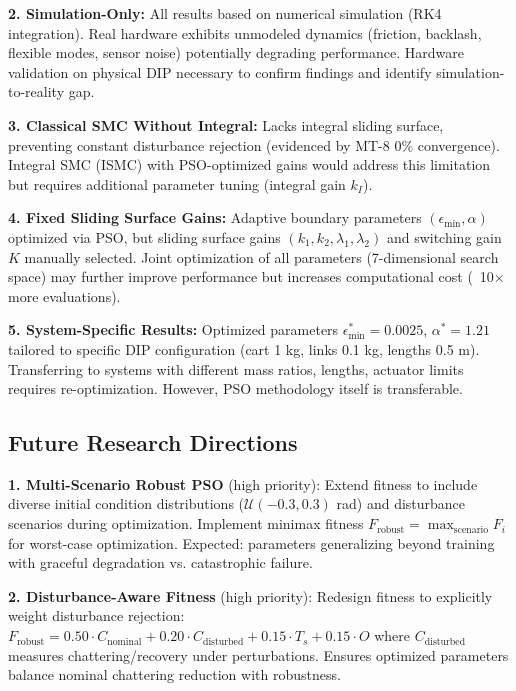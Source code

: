 \documentclass[conference]{IEEEtran}
\begin{document}
\textbf{2. Simulation-Only:} All results based on numerical simulation (RK4 integration). Real hardware exhibits unmodeled dynamics (friction, backlash, flexible modes, sensor noise) potentially degrading performance. Hardware validation on physical DIP necessary to confirm findings and identify simulation-to-reality gap.

\textbf{3. Classical SMC Without Integral:} Lacks integral sliding surface, preventing constant disturbance rejection (evidenced by MT-8 0\% convergence). Integral SMC (ISMC) with PSO-optimized gains would address this limitation but requires additional parameter tuning (integral gain $k_I$).

\textbf{4. Fixed Sliding Surface Gains:} Adaptive boundary parameters $(\epsilon_{\min}, \alpha)$ optimized via PSO, but sliding surface gains $(k_1, k_2, \lambda_1, \lambda_2)$ and switching gain $K$ manually selected. Joint optimization of all parameters (7-dimensional search space) may further improve performance but increases computational cost (~10$\times$ more evaluations).

\textbf{5. System-Specific Results:} Optimized parameters $\epsilon_{\min}^* = 0.0025$, $\alpha^* = 1.21$ tailored to specific DIP configuration (cart 1 kg, links 0.1 kg, lengths 0.5 m). Transferring to systems with different mass ratios, lengths, actuator limits requires re-optimization. However, PSO methodology itself is transferable.

\subsection{Future Research Directions}

\textbf{1. Multi-Scenario Robust PSO} (high priority): Extend fitness to include diverse initial condition distributions ($\mathcal{U}(-0.3, 0.3)$ rad) and disturbance scenarios during optimization. Implement minimax fitness $F_{\text{robust}} = \max_{\text{scenario}} F_i$ for worst-case optimization. Expected: parameters generalizing beyond training with graceful degradation vs. catastrophic failure.

\textbf{2. Disturbance-Aware Fitness} (high priority): Redesign fitness to explicitly weight disturbance rejection: $F_{\text{robust}} = 0.50 \cdot C_{\text{nominal}} + 0.20 \cdot C_{\text{disturbed}} + 0.15 \cdot T_s + 0.15 \cdot O$ where $C_{\text{disturbed}}$ measures chattering/recovery under perturbations. Ensures optimized parameters balance nominal chattering reduction with robustness.
\end{document}
